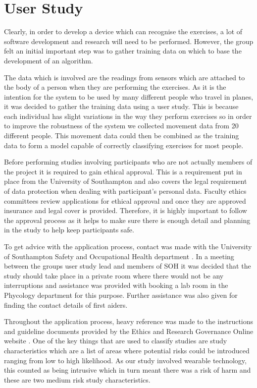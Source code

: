 \chapter{User Study}
Clearly, in order to develop a device which can recognise the exercises, a lot of software development and research will need to be performed. However, the group felt an initial important step was to gather training data on which to base the development of an algorithm.

The data which is involved are the readings from sensors which are attached to the body of a person when they are performing the exercises. As it is the intention for the system to be used by many different people who travel in planes, it was decided to gather the training data using a user study. This is because each individual has slight variations in the way they perform exercises so in order to improve the robustness of the system we collected movement data from 20 different people. This movement data could then be combined as the training data to form a model capable of correctly classifying exercises for most people.

Before performing studies involving participants who are not actually members of the project it is required to gain ethical approval. This is a requirement put in place from the University of Southampton and also covers the legal requirement of data protection when dealing with participant’s personal data. Faculty ethics committees review applications for ethical approval and once they are approved insurance and legal cover is provided. Therefore, it is highly important to follow the approval process as it helps to make sure there is enough detail and planning in the study to help keep participants safe.

To get advice with the application process, contact was made with the University of Southampton Safety and Occupational Health department \cite{sotonsoh}. In a meeting between the groups user study lead and members of SOH it was decided that the study should take place in a private room where there would not be any interruptions and assistance was provided with booking a lab room in the Phycology department for this purpose. Further assistance was also given for finding the contact details of first aiders.

Throughout the application process, heavy reference was made to the instructions and guideline documents provided by the Ethics and Research Governance Online website \cite{ergo}. One of the key things that are used to classify studies are study characteristics which are a list of areas where potential risks could be introduced ranging from low to high likelihood. As our study involved wearable technology, this counted as being intrusive which in turn meant there was a risk of harm and these are two medium risk study characteristics.

